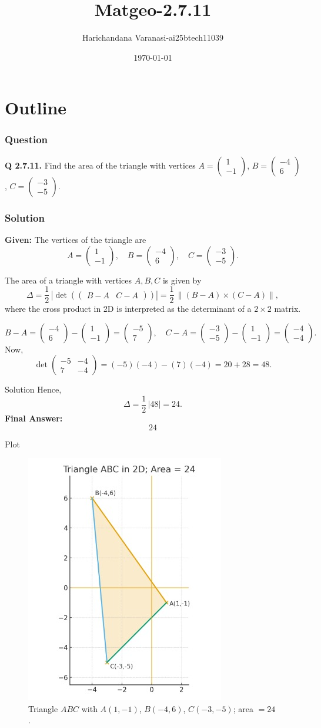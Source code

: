 \documentclass{beamer}
\title{Matgeo-2.7.11}
\author{Harichandana Varanasi-ai25btech11039}
\date{\today}
\theoremstyle{remark}
\newcommand{\myvec}[1]{\ensuremath{\begin{pmatrix}#1\end{pmatrix}}}
\begin{document}
\begin{frame}
\titlepage
\end{frame}

\section*{Outline}

\begin{frame}
\frametitle{Question}
\textbf{Q 2.7.11.} Find the area of the triangle with vertices
$A=\myvec{1\\-1}$,\; $B=\myvec{-4\\6}$,\; $C=\myvec{-3\\-5}$.

\end{frame}
%
\begin{frame}
\frametitle{Solution}
\textbf{Given:} The vertices of the triangle are
\[
A = \myvec{1\\-1}, \quad B = \myvec{-4\\6}, \quad C = \myvec{-3\\-5}.
\]

\medskip

The area of a triangle with vertices $A,B,C$ is given by
\[
\Delta = \frac{1}{2}\,\left|\det\left(\myvec{B-A & C-A}\right)\right|
= \frac{1}{2}\,\left\|(B-A)\times(C-A)\right\|,
\]
where the cross product in 2D is interpreted as the determinant of a $2\times2$ matrix.

\medskip

\[
B - A = \myvec{-4\\6}-\myvec{1\\-1}=\myvec{-5\\7}, \quad
C - A = \myvec{-3\\-5}-\myvec{1\\-1}=\myvec{-4\\-4}.
\]
Now,
\[
\det\myvec{-5 & -4\\ 7 & -4} = (-5)(-4) - (7)(-4) = 20+28=48.
\]


\end{frame}
\begin{frame}{Solution}
    Hence,
\[
\Delta = \frac{1}{2}\,|48|=24.
\]
\medskip
\textbf{Final Answer:}
\[
\boxed{24}
\]

\end{frame}
\begin{frame}{Plot}
     \begin{figure}[h!]
\centering
\includegraphics[width=0.5\linewidth]{figs/2.7.11.jpeg}
\caption{Triangle $ABC$ with $A(1,-1)$, $B(-4,6)$, $C(-3,-5)$; area $=24$.}


\end{figure}
\end{frame}
\end{document}
